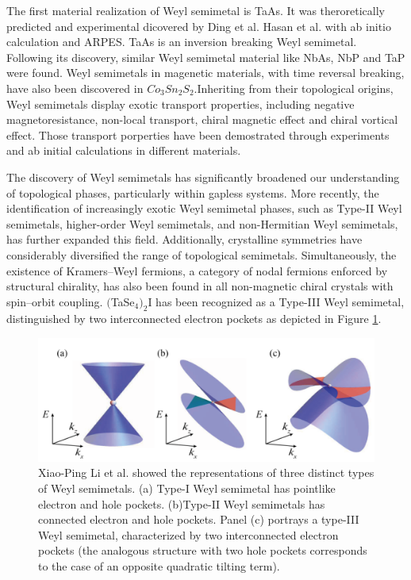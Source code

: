 The first material realization of Weyl semimetal is TaAs. It was theroretically predicted and experimental dicovered by Ding et al.\cite{weng2015weyl, lv2015experimental} Hasan et al.\cite{huang2015weyl, xu2015discovery, lee2015fermi} with ab initio calculation and ARPES. TaAs is an inversion breaking Weyl semimetal. Following its discovery, similar Weyl semimetal material like NbAs, NbP and TaP \cite{sun2015topological, lee2015fermi} were found. Weyl semimetals in magenetic materials, with time reversal breaking, have also been discovered in $ Co_3Sn_2S_2$\cite{liu2019magnetic}.Inheriting from their topological origins, Weyl semimetals display exotic transport properties, including negative magnetoresistance, non-local transport, chiral magnetic effect and chiral vortical effect. Those transport porperties have been demostrated through experiments and ab initial calculations in different materials\cite{wang2017quantum}.

The discovery of Weyl semimetals has significantly broadened our understanding of topological phases, particularly within gapless systems. More recently, the identification of increasingly exotic Weyl semimetal phases, such as Type-II Weyl semimetals\cite{soluyanov2015type, jiang2017signature, kumar2017extremely}, higher-order Weyl semimetals\cite{wang2020higher}, and non-Hermitian Weyl semimetals\cite{zyuzin2018flat}, has further expanded this field. Additionally, crystalline symmetries have considerably diversified the range of topological semimetals. Simultaneously, the existence of Kramers–Weyl fermions, a category of nodal fermions enforced by structural chirality, has also been found in  all non-magnetic chiral crystals with spin–orbit coupling\cite{chang2018topological}. $($TaSe$_4)_2$I has been recognized as a Type-III Weyl semimetal\cite{li2021correlated}, distinguished by two interconnected electron pockets as depicted in Figure \ref{fig:type3}.

 \begin{figure}[h]
    \centering
    \includegraphics[width =\textwidth]{images/typeIII.png}
    \caption{ Xiao-Ping Li et al.\cite{li2021correlated} showed the representations of three distinct types of Weyl semimetals. (a) Type-I Weyl semimetal has pointlike electron and hole pockets. (b)Type-II Weyl semimetals has connected electron and hole pockets. Panel (c) portrays a type-III Weyl semimetal, characterized by two interconnected electron pockets (the analogous structure with two hole pockets corresponds to the case of an opposite quadratic tilting term).
    }
    \label{fig:type3}
\end{figure}

